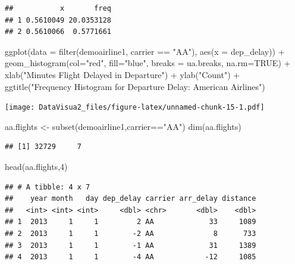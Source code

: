 \documentclass[
]{article}
\newenvironment{Shaded}{\begin{snugshade}}{\end{snugshade}}
\newcommand{\AttributeTok}[1]{\textcolor[rgb]{0.77,0.63,0.00}{#1}}
\newcommand{\ConstantTok}[1]{\textcolor[rgb]{0.00,0.00,0.00}{#1}}
\newcommand{\DecValTok}[1]{\textcolor[rgb]{0.00,0.00,0.81}{#1}}
\newcommand{\FunctionTok}[1]{\textcolor[rgb]{0.00,0.00,0.00}{#1}}
\newcommand{\NormalTok}[1]{#1}
\newcommand{\OtherTok}[1]{\textcolor[rgb]{0.56,0.35,0.01}{#1}}
\newcommand{\SpecialCharTok}[1]{\textcolor[rgb]{0.00,0.00,0.00}{#1}}
\newcommand{\StringTok}[1]{\textcolor[rgb]{0.31,0.60,0.02}{#1}}
\begin{document}
\begin{verbatim}
##           x       freq
## 1 0.5610049 20.0353128
## 2 0.5610066  0.5771661
\end{verbatim}

\begin{Shaded}
\begin{Highlighting}[]
\FunctionTok{ggplot}\NormalTok{(}\AttributeTok{data =} \FunctionTok{filter}\NormalTok{(demoairline1, carrier }\SpecialCharTok{==} \StringTok{"AA"}\NormalTok{), }\FunctionTok{aes}\NormalTok{(}\AttributeTok{x =}\NormalTok{ dep\_delay)) }\SpecialCharTok{+} \FunctionTok{geom\_histogram}\NormalTok{(}\AttributeTok{col=}\StringTok{"red"}\NormalTok{, }\AttributeTok{fill=}\StringTok{"blue"}\NormalTok{, }\AttributeTok{breaks =}\NormalTok{ ua.breaks, }\AttributeTok{na.rm=}\ConstantTok{TRUE}\NormalTok{) }\SpecialCharTok{+} \FunctionTok{xlab}\NormalTok{(}\StringTok{"Minutes Flight Delayed in Departure"}\NormalTok{) }\SpecialCharTok{+} \FunctionTok{ylab}\NormalTok{(}\StringTok{"Count"}\NormalTok{) }\SpecialCharTok{+} \FunctionTok{ggtitle}\NormalTok{(}\StringTok{"Frequency Histogram for Departure Delay: American Airlines"}\NormalTok{)}
\end{Highlighting}
\end{Shaded}

\texttt{[image: DataVisua2\_files/figure-latex/unnamed-chunk-15-1.pdf]}

\begin{Shaded}
\begin{Highlighting}[]
\NormalTok{aa.flights }\OtherTok{\textless{}{-}} \FunctionTok{subset}\NormalTok{(demoairline1,carrier}\SpecialCharTok{==}\StringTok{"AA"}\NormalTok{)}
\FunctionTok{dim}\NormalTok{(aa.flights)}
\end{Highlighting}
\end{Shaded}

\begin{verbatim}
## [1] 32729     7
\end{verbatim}

\begin{Shaded}
\begin{Highlighting}[]
\FunctionTok{head}\NormalTok{(aa.flights,}\DecValTok{4}\NormalTok{)}
\end{Highlighting}
\end{Shaded}

\begin{verbatim}
## # A tibble: 4 x 7
##    year month   day dep_delay carrier arr_delay distance
##   <int> <int> <int>     <dbl> <chr>       <dbl>    <dbl>
## 1  2013     1     1         2 AA             33     1089
## 2  2013     1     1        -2 AA              8      733
## 3  2013     1     1        -1 AA             31     1389
## 4  2013     1     1        -4 AA            -12     1085
\end{verbatim}
\end{document}
